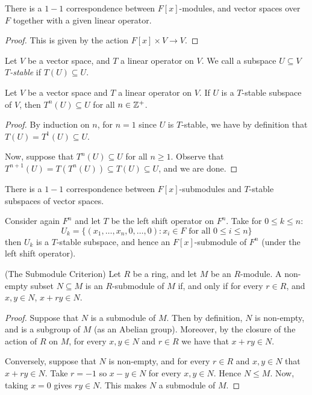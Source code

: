 \begin{theorem}\label{theorem_9.1.2}
  There is a $1-1$ correspondence between $F[x]$-modules, and
  vector spaces over $F$ together with a given linear operator.
\end{theorem}
\begin{proof}
  This is given by the action $F[x] \times V \xrightarrow{} V$.
\end{proof}

\begin{definition}
  Let $V$ be a vector space, and $T$ a linear operator on $V$. We
  call a subspace $U \subseteq V$ \textit{$T$-stable} if $T(U)
  \subseteq U$.
\end{definition}

\begin{lemma}\label{lemma_9.1.3}
  Let $V$ be a vector space and $T$ a linear operator on $V$. If $U$
  is a $T$-stable subspace of $V$, then $T^n(U) \subseteq U$ for all
  $n \in \mathbb{Z}^+$.
\end{lemma}
\begin{proof}
  By induction on $n$, for $n=1$ since $U$ is  $T$-stable, we have
  by definition that $T(U)=T^1(U) \subseteq U$.

  Now, suppose that $T^n(U) \subseteq U$ for all $n \geq 1$. Observe
  that $T^{n+1}(U)=T(T^n(U)) \subseteq T(U) \subseteq U$, and we are
  done.
\end{proof}
\begin{corollary}
  There is a $1-1$ correspondence between $F[x]$-submodules and
  $T$-stable subspaces of vector spaces.
\end{corollary}

\begin{example}\label{exampl_9.4}
  Consider again $F^n$ and let $T$ be the left shift operator on
  $F^n$. Take for $0 \leq k \leq n$:
  \begin{equation*}
    U_k=\{(x_1, \dots, x_n, 0, \dots, 0) : x_i \in F \text{ for all
    } 0 \leq i \leq n\}
  \end{equation*}
  then $U_k$ is a $T$-stable subspace, and hence an $F[x]$-submodule
  of $F^n$ (under the left shift operator).
\end{example}

\begin{proposition}(The Submodule Criterion)\label{proposition_9.1.4}
  Let $R$ be a ring, and let $M$ be an $R$-module. A non-empty
  subset $N \subseteq M$ is an $R$-submodule of $M$ if, and only if
  for every $r \in R$, and $x,y \in N$, $x+ry \in N$.
\end{proposition}
\begin{proof}
  Suppose that $N$ is a submodule of $M$. Then by definition, $N$ is
  non-empty, and is a subgroup of $M$ (as an Abelian group).
  Moreover, by the closure of the action of $R$ on $M$, for every
  $x,y \in N$ and $r \in R$ we have that $x+ry \in N$.

  Conversely, suppose that $N$ is non-empty, and for every $r
  \in R$ and $x,y \in N$ that $x+ry \in N$. Take $r=-1$ so $x-y \in
  N$ for every $x,y \in N$. Hence $N \leq M$. Now, taking $x=0$
  gives $ry \in N$. This makes $N$ a submodule of $M$.
\end{proof}
